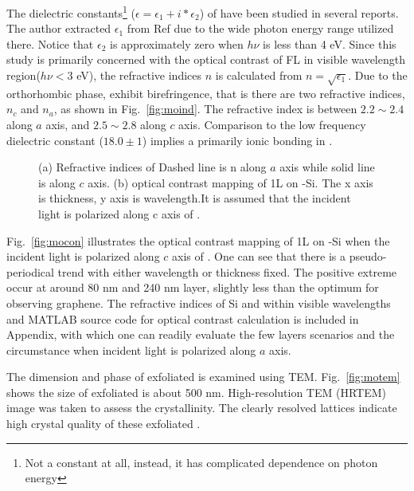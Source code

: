 The dielectric constants\footnote{Not a constant at all, instead, it has complicated dependence on photon energy} ($\epsilon = \epsilon_1 + i*\epsilon_2$) of  have been studied in several reports.\cite{Deb1968,Sabhapathi1995,Miyata1996,Abdellaoui1997,Mondragon1999} The author extracted $\epsilon_1$ from Ref\cite{Itoh2001a} due to the wide photon energy range utilized there. Notice that $\epsilon_2$ is approximately zero when $h\nu$ is less than 4 eV. Since this study is primarily concerned with the optical contrast of FL  in visible wavelength region($h\nu < 3$ eV), the refractive indices $n$ is calculated from $n = \sqrt{\epsilon_1}$. Due to the orthorhombic phase,  exhibit birefringence, that is there are two refractive indices, $n_c$ and $n_a$, as shown in Fig.~\ref{fig:moind}. The refractive index is between $ 2.2\sim 2.4$ along $a$ axis, and $ 2.5\sim 2.8$ along $c$ axis. Comparison to the low frequency dielectric constant ($18.0\pm1$) implies a primarily ionic bonding in .\cite{He2003}

\begin{figure}[htb]
\centering
{}\hspace{0.04\textwidth}
\caption[Refractive indices of ]{(a) Refractive indices of  Dashed line is n along $a$ axis while solid line is along $c$ axis. (b) optical contrast mapping of 1L  on -Si. The x axis is  thickness, y axis is wavelength.It is assumed that the incident light is polarized along c axis of .}
\label{fig:mofl}
\end{figure}

Fig.~\ref{fig:mocon} illustrates the optical contrast mapping of 1L  on -Si when the incident light is polarized along $c$ axis of . One can see that there is a pseudo-periodical trend with either wavelength or  thickness fixed. The positive extreme occur at around 80 nm and 240 nm  layer, slightly less than the optimum for observing graphene. The refractive indices of Si and  within visible wavelengths and MATLAB source code for optical contrast calculation is included in Appendix, with which one can readily evaluate the few layers  scenarios and the circumstance when incident light is polarized along $a$ axis.

The dimension and phase of exfoliated  is examined using TEM. Fig.~\ref{fig:motem} shows the size of exfoliated  is about 500 nm. High-resolution TEM (HRTEM) image was taken to assess the  crystallinity. The clearly resolved lattices indicate high crystal quality of these exfoliated .

